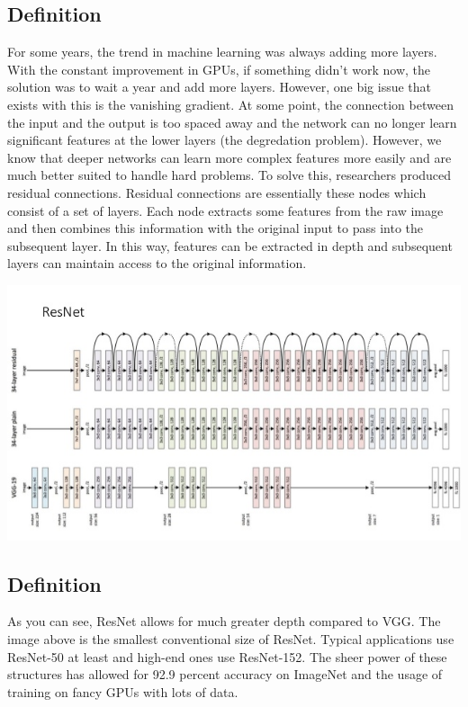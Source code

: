 \documentclass{article}
\begin{document}
\subsection{Definition}
For some years, the trend in machine learning was always adding more layers. With the constant improvement in GPUs, if something didn't work now, the solution was to wait a year and add more layers. However, one big issue that exists with this is the vanishing gradient. At some point, the connection between the input and the output is too spaced away and the network can no longer learn significant features at the lower layers (the degredation problem). However, we know that deeper networks can learn more complex features more easily and are much better suited to handle hard problems. To solve this, researchers produced residual connections. Residual connections are essentially these nodes which consist of a set of layers. Each node extracts some features from the raw image and then combines this information with the original input to pass into the subsequent layer. In this way, features can be extracted in depth and subsequent layers can maintain access to the original information. 

\begin{center}
\includegraphics[scale=0.5]{resnet.jpg}
\end{center}
\subsection{Definition}
As you can see, ResNet allows for much greater depth compared to VGG. The image above is the smallest conventional size of ResNet. Typical applications use ResNet-50 at least and high-end ones use ResNet-152. The sheer power of these structures has allowed for 92.9 percent accuracy on ImageNet and the usage of training on fancy GPUs with lots of data.
\end{document}
